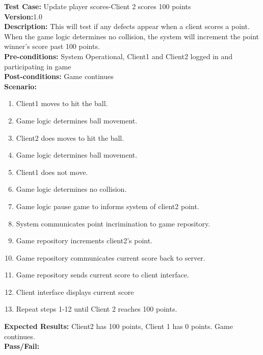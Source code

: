 \noindent \textbf{Test Case:} Update player scores-Client 2 scores 100 points\\
\textbf{Version:}1.0\\
\textbf{Description:} This will test if any defects appear when a client scores a point.  When the game logic determines no collision, the system will increment the point winner's score past 100 points.\\
\textbf{Pre-conditions:} System Operational, Client1 and Client2 logged in and participating in game \\
\textbf{Post-conditions:} Game continues\\
\textbf{Scenario:}
\begin{enumerate}
\item Client1 moves to hit the ball.
\item Game logic determines ball movement.
\item Client2 does moves to hit the ball. 
\item Game logic determines ball movement.
\item Client1 does not move.
\item Game logic determines no collision. 
\item Game logic pause game to informs system of client2 point.
\item System communicates point incrimination to game repository.
\item Game repository increments client2’s point.
\item Game repository communicates current score back to server.
\item Game repository sends current score to client interface.
\item Client interface displays current score
\item Repeat steps 1-12 until Client 2 reaches 100 points.
\end{enumerate}
\textbf{Expected Results:} Client2 has 100 points, Client 1 has 0 points.  Game continues.\\
\textbf{Pass/Fail:}















